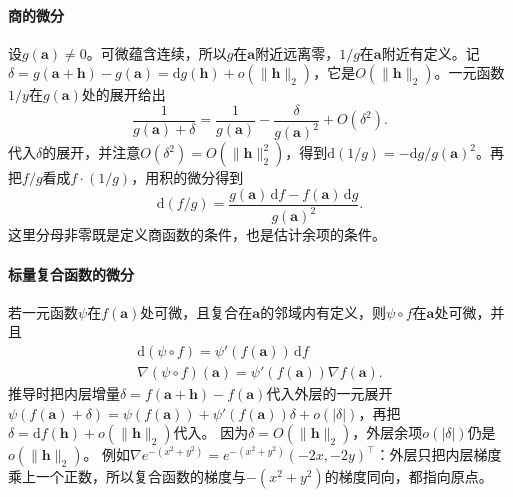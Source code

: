 \paragraph{商的微分}
设$g(\bm a)\neq0$。可微蕴含连续，所以$g$在$\bm a$附近远离零，$1/g$在$\bm a$附近有定义。记$\delta=g(\bm a+\bm h)-g(\bm a)=\mathrm dg(\bm h)+o(\lVert\bm h\rVert_2)$，它是$O(\lVert\bm h\rVert_2)$。一元函数$1/y$在$g(\bm a)$处的展开给出
\[
 \frac1{g(\bm a)+\delta}=\frac1{g(\bm a)}-\frac{\delta}{g(\bm a)^2}+O(\delta^2).
\]
代入$\delta$的展开，并注意$O(\delta^2)=O(\lVert\bm h\rVert_2^2)$，得到$\mathrm d(1/g)=-\mathrm dg/g(\bm a)^2$。再把$f/g$看成$f\cdot(1/g)$，用积的微分得到
\[
 \mathrm d(f/g)=\frac{g(\bm a)\,\mathrm df-f(\bm a)\,\mathrm dg}{g(\bm a)^2}.
\]
这里分母非零既是定义商函数的条件，也是估计余项的条件。

\paragraph{标量复合函数的微分}
若一元函数$\psi$在$f(\bm a)$处可微，且复合在$\bm a$的邻域内有定义，则$\psi\circ f$在$\bm a$处可微，并且
\[
 \begin{gathered}
\mathrm d(\psi\circ f)=\psi'(f(\bm a))\,\mathrm df\\
\nabla(\psi\circ f)(\bm a)=\psi'(f(\bm a))\nabla f(\bm a).
 \end{gathered}
\]
推导时把内层增量$\delta=f(\bm a+\bm h)-f(\bm a)$代入外层的一元展开$\psi(f(\bm a)+\delta)=\psi(f(\bm a))+\psi'(f(\bm a))\delta+o(|\delta|)$，再把$\delta=\mathrm df(\bm h)+o(\lVert\bm h\rVert_2)$代入。
因为$\delta=O(\lVert\bm h\rVert_2)$，外层余项$o(|\delta|)$仍是$o(\lVert\bm h\rVert_2)$。
例如$\nabla e^{-(x^2+y^2)}=e^{-(x^2+y^2)}(-2x,-2y)^\top$：外层只把内层梯度乘上一个正数，所以复合函数的梯度与$-(x^2+y^2)$的梯度同向，都指向原点。

